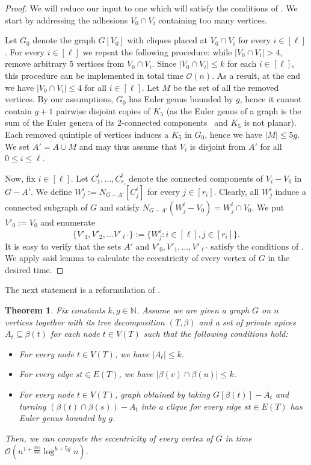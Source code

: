 \documentclass[11pt,a4paper]{article}
\newtheorem{theorem}[lemma]{Theorem}
\newcommand{\Oh}{\mathcal{O}}
\renewcommand{\leq}{\leqslant}
\renewcommand{\setminus}{-}
\begin{document}
\begin{proof}
We will reduce our input to one which will satisfy the conditions of . We start by addressing the adhesions $V_0 \cap V_i$ containing too many vertices.

Let $G_0$ denote the graph $G[V_0]$ with cliques placed at $V_0 \cap V_i$ for every $i \in [\ell]$.
For every $i \in [\ell]$ we repeat the following procedure: while $|V_0 \cap V_i| > 4$,
remove arbitrary $5$ vertices from $V_0 \cap V_i$. Since $|V_0 \cap V_i| \leq k$ for each $i\in [\ell]$,
this procedure can be implemented in total time $\Oh(n)$. As a result, at the end we have $|V_0 \cap V_i| \leq 4$ for all $i \in [\ell]$. Let $M$ be the set of all the removed vertices. By our assumptions, $G_0$ has Euler genus bounded by $g$, hence it cannot contain $g + 1$ pairwise disjoint copies of $K_5$
(as the Euler genus of a graph is the sum of the Euler genera of its 2-connected components~\cite{StahlB77} and $K_5$ is not planar). Each removed quintiple of vertices induces a $K_5$ in $G_0$, hence we have $|M| \leq 5g$. We set $A' = A \cup M$ and may thus assume that $V_i$ is disjoint from $A'$ for all $0 \leq i \leq \ell$.

Now, fix $i \in [\ell]$. Let $C^i_1, \dots, C^i_{r_i}$ denote the connected components of $V_i - V_0$ in $G - A'$. We define $W^i_j := N_{G - A'}[C^i_j]$ for every $j \in [r_i]$. Clearly, all $W^i_j$ induce a connected subgraph of $G$ and satisfy $N_{G - A'}(W^i_j - V_0) = W^i_j \cap V_0$. We put $V'_0 := V_0$ and enumerate
$$
\{V'_1, V'_2, \dots V'_{\ell'}\} := \{ W^i_j \colon i \in [\ell], j \in [r_i] \}.
$$
It is easy to verify that the sets $A'$ and $V'_0, V'_1, \dots, V'_{\ell'}$ satisfy the conditions of . We apply said lemma to calculate the eccentricity of every vertex of $G$ in the desired time.
\end{proof}



The next statement is a reformulation of .

\begin{theorem}
Fix constants $k, g \in \mathbb{N}$. Assume we are given a graph $G$ on $n$ vertices together with its tree decomposition $(T, \beta)$ and a set of private apices $A_t \subseteq \beta(t)$ for each node $t\in V(T)$ such that the following conditions hold:
\begin{itemize}[nosep]
 \item For every node $t \in V(T)$, we have $|A_t| \leq k$.
 \item For every edge $st \in E(T)$,  we have $|\beta(v) \cap \beta(u)|\leq k$.
 \item For every node $t \in V(T)$, graph obtained by taking $G[\beta(t)] - A_t$ and turning  $(\beta(t) \cap \beta(s))\setminus A_t$ into a clique for every edge $st \in E(T)$ has Euler genus bounded by $g$.
\end{itemize}
Then, we can compute the eccentricity of every vertex of $G$ in time $\Oh \left( n^{1 + \frac{355}{356}} \log^{k + 5g} n \right)$.
\end{theorem}
\end{document}
